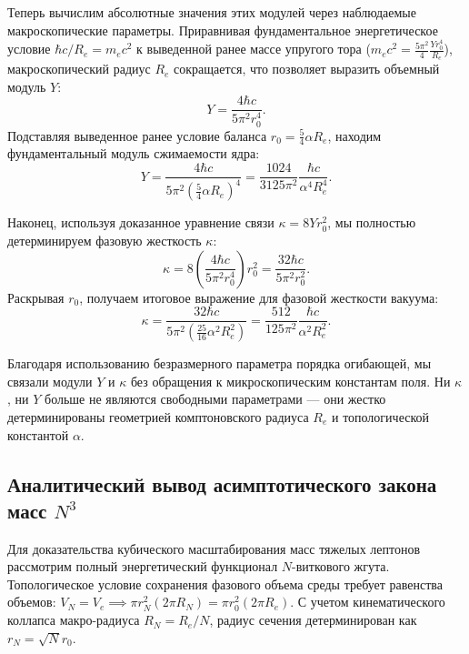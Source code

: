\documentclass[11pt,a4paper]{article}
\begin{document}
Теперь вычислим абсолютные значения этих модулей через наблюдаемые макроскопические параметры. 
Приравнивая фундаментальное энергетическое условие $\hbar c / R_e = m_e c^2$ к выведенной ранее массе упругого тора ($m_e c^2 = \frac{5\pi^2}{4} \frac{Y r_0^4}{R_e}$), макроскопический радиус $R_e$ сокращается, что позволяет выразить объемный модуль $Y$:
\begin{equation}
	Y = \frac{4 \hbar c}{5\pi^2 r_0^4}.
\end{equation}
Подставляя выведенное ранее условие баланса $r_0 = \frac{5}{4}\alpha R_e$, находим фундаментальный модуль сжимаемости ядра:
\begin{equation}
	Y = \frac{4 \hbar c}{5\pi^2 \left( \frac{5}{4}\alpha R_e \right)^4} = \frac{1024}{3125 \pi^2} \frac{\hbar c}{\alpha^4 R_e^4}.
\end{equation}

Наконец, используя доказанное уравнение связи $\kappa = 8 Y r_0^2$, мы полностью детерминируем фазовую жесткость $\kappa$:
\begin{equation}
	\kappa = 8 \left( \frac{4 \hbar c}{5\pi^2 r_0^4} \right) r_0^2 = \frac{32 \hbar c}{5\pi^2 r_0^2}.
\end{equation}
Раскрывая $r_0$, получаем итоговое выражение для фазовой жесткости вакуума:
\begin{equation}
	\kappa = \frac{32 \hbar c}{5\pi^2 \left(\frac{25}{16} \alpha^2 R_e^2\right)} = \frac{512}{125 \pi^2} \frac{\hbar c}{\alpha^2 R_e^2}.
\end{equation}

Благодаря использованию безразмерного параметра порядка огибающей, мы связали модули $Y$ и $\kappa$ без обращения к микроскопическим константам поля. Ни $\kappa$, ни $Y$ больше не являются свободными параметрами — они жестко детерминированы геометрией комптоновского радиуса $R_e$ и топологической константой $\alpha$.
	
	\subsection{Аналитический вывод асимптотического закона масс $N^3$}
	Для доказательства кубического масштабирования масс тяжелых лептонов рассмотрим полный энергетический функционал $N$-виткового жгута. Топологическое условие сохранения фазового объема среды требует равенства объемов: $V_N = V_e \implies \pi r_N^2 (2\pi R_N) = \pi r_0^2 (2\pi R_e)$. С учетом кинематического коллапса макро-радиуса $R_N = R_e / N$, радиус сечения детерминирован как $r_N = \sqrt{N} r_0$.
	
\end{document}
